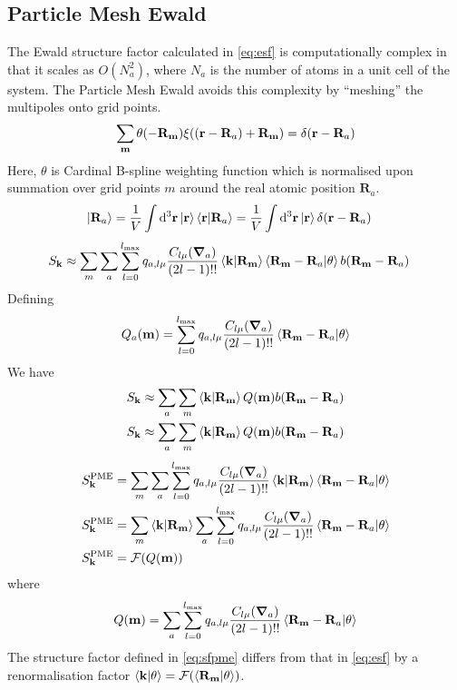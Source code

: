 \documentclass[12pt]{extarticle}
\renewcommand{\bf}{\mathbf}
\begin{document}
    \subsection{Particle Mesh Ewald}
    The Ewald structure factor calculated in \cref{eq:esf} is computationally complex in that it scales as \(O(N_a^2)\), where \(N_a\) is the number of atoms in a unit cell of the system. The Particle Mesh Ewald avoids this complexity by ``meshing'' the multipoles onto grid points. 
    \begin{align*}
        \sum_{\bf m} \theta(-\bf R_{\bf m}) \xi\pqty{\pqty{\bf r - \bf R_a} + \bf R_{\bf m}} = \delta(\bf r -\bf R_a)
    \end{align*}
    Here, \(\theta\) is Cardinal B-spline weighting function which is normalised upon summation over grid points \(m\) around the real atomic position \(\bf R_a\). 
    \begin{align*}
        \ket{\bf R_a} &= \frac{1}{V}\int \dd[3]{\bf r} \ket{\bf r} \bra{\bf r} \ket{\bf R_a} = \frac{1}{V}\int \dd[3]{\bf r} \ket{\bf r} \delta \pqty{\bf r -\bf  R_a}
    \end{align*}
    \begin{align}
        S_{\bf k} & \approx \sum_m \sum_{a} \sum_{l = 0}^{l_{\max}} q_{a, l \mu} \frac{C_{l \mu} (\grad_a)}{(2l - 1)!!}  \bra{\bf k}\ket{\bf R_{\bf m}} \bra{\bf R_{\bf m} - \bf R_a} \ket{\theta} b(\bf R_{\bf m} - \bf R_a) 
    \end{align}
    Defining \[
        Q_a(\bf m) = \sum_{l = 0}^{l_{\max}} q_{a, l \mu} \frac{C_{l \mu} (\grad_a)}{(2l - 1)!!} \bra{\bf R_{\bf m} - \bf R_a} \ket{\theta}
    \]
    We have \begin{align*}
        S_{\bf k} & \approx \sum_a \sum_m \bra{\bf k}\ket{\bf R_{\bf m}} Q(\bf m) b(\bf R_{\bf m} - \bf R_a) \\
        S_{\bf k} & \approx \sum_a \sum_m \bra{\bf k}\ket{\bf R_{\bf m}} Q(\bf m) b(\bf R_{\bf m} - \bf R_a) \\
    \end{align*}
    \begin{align}
        S^\text{PME}_{\bf k} &= \sum_m \sum_{a} \sum_{l = 0}^{l_{\max}} q_{a, l \mu} \frac{C_{l \mu} (\grad_a)}{(2l - 1)!!} \bra{\bf k} \ket{\bf R_{\bf m}} \bra{\bf R_{\bf m} - \bf R_a} \ket{\theta}\nonumber\\
        S^\text{PME}_{\bf k} &=  \sum_m  \bra{\bf k} \ket{\bf R_{\bf m}} \sum_{a} \sum_{l = 0}^{l_{\max}} q_{a, l \mu} \frac{C_{l \mu} (\grad_a)}{(2l - 1)!!} \bra{\bf R_{\bf m} - \bf R_a} \ket{\theta}\nonumber\\
        S^\text{PME}_{\bf k} &=  \mathcal{F} \pqty{ Q(\bf m)}
        \label{eq:sfpme}
    \end{align}
    where \[
        Q(\bf m) = \sum_{a} \sum_{l = 0}^{l_{\max}} q_{a, l \mu} \frac{C_{l \mu} (\grad_a)}{(2l - 1)!!} \bra{\bf R_{\bf m} - \bf R_a} \ket{\theta}
    \]
    The structure factor defined in \cref{eq:sfpme} differs from that in \cref{eq:esf} by a renormalisation factor \(\bra{\bf k} \ket{\theta} = \mathcal{F} \pqty{\bra{\bf R_{\bf m}} \ket{\theta}}\).
\end{document}
